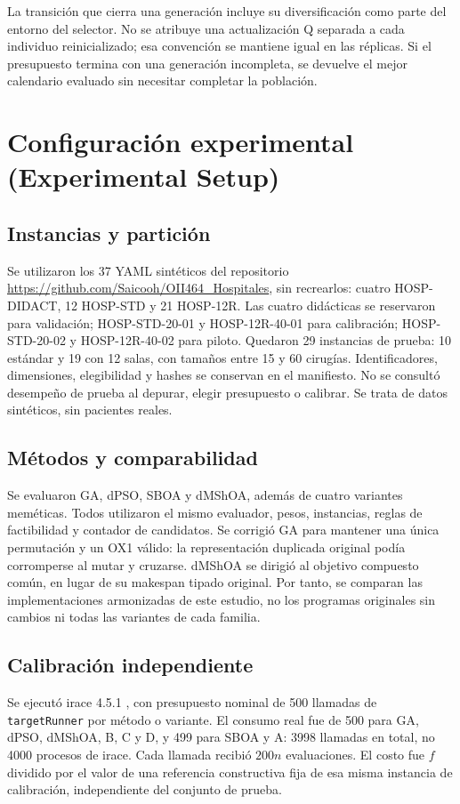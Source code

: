\documentclass[11pt,a4paper]{article}
\begin{document}
La transición que cierra una generación incluye su diversificación como parte del entorno del selector. No se atribuye una actualización Q separada a cada individuo reinicializado; esa convención se mantiene igual en las réplicas. Si el presupuesto termina con una generación incompleta, se devuelve el mejor calendario evaluado sin necesitar completar la población.

\section{Configuración experimental (Experimental Setup)}
\subsection{Instancias y partición}
Se utilizaron los 37 YAML sintéticos del repositorio \url{https://github.com/Saicooh/OII464_Hospitales}, sin recrearlos: cuatro HOSP-DIDACT, 12 HOSP-STD y 21 HOSP-12R. Las cuatro didácticas se reservaron para validación; HOSP-STD-20-01 y HOSP-12R-40-01 para calibración; HOSP-STD-20-02 y HOSP-12R-40-02 para piloto. Quedaron 29 instancias de prueba: 10 estándar y 19 con 12 salas, con tamaños entre 15 y 60 cirugías. Identificadores, dimensiones, elegibilidad y hashes se conservan en el manifiesto. No se consultó desempeño de prueba al depurar, elegir presupuesto o calibrar. Se trata de datos sintéticos, sin pacientes reales.

\subsection{Métodos y comparabilidad}
Se evaluaron GA, dPSO, SBOA y dMShOA, además de cuatro variantes meméticas. Todos utilizaron el mismo evaluador, pesos, instancias, reglas de factibilidad y contador de candidatos. Se corrigió GA para mantener una única permutación y un OX1 válido: la representación duplicada original podía corromperse al mutar y cruzarse. dMShOA se dirigió al objetivo compuesto común, en lugar de su makespan tipado original. Por tanto, se comparan las implementaciones armonizadas de este estudio, no los programas originales sin cambios ni todas las variantes de cada familia.

\subsection{Calibración independiente}
Se ejecutó irace 4.5.1 \cite{irace}, con presupuesto nominal de 500 llamadas de \texttt{targetRunner} por método o variante. El consumo real fue de 500 para GA, dPSO, dMShOA, B, C y D, y 499 para SBOA y A: 3998 llamadas en total, no 4000 procesos de irace. Cada llamada recibió $200n$ evaluaciones. El costo fue $f$ dividido por el valor de una referencia constructiva fija de esa misma instancia de calibración, independiente del conjunto de prueba.
\end{document}
